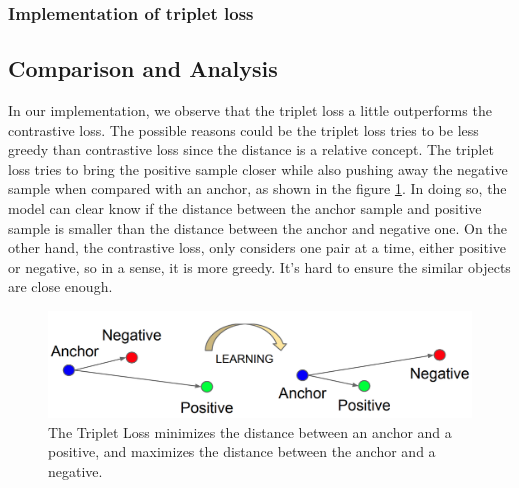 \subsubsection{Implementation of triplet loss}


\subsection{Comparison and Analysis}

In our implementation, we observe that the triplet loss a little outperforms the contrastive loss. The possible reasons could be the triplet loss tries to be less greedy than contrastive loss since the distance is a relative concept. The triplet loss tries to bring the positive sample closer while also pushing away the negative sample when compared with an anchor, as shown in the figure \ref{fig:tripletloss}. In doing so, the model can clear know if the distance between the anchor sample and positive sample is smaller than the distance between the anchor and negative one. On the other hand, the contrastive loss, only considers one pair at a time, either positive or negative, so in a sense, it is more greedy. It's hard to ensure the similar objects are close enough. 

\begin{figure}[h]
  \centering
  \includegraphics[width=\linewidth]{figs/tripletloss.png}
  \caption{The Triplet Loss minimizes the distance between an anchor and a positive, and maximizes the distance between the anchor and a negative.}
  \label{fig:tripletloss}
\end{figure}

